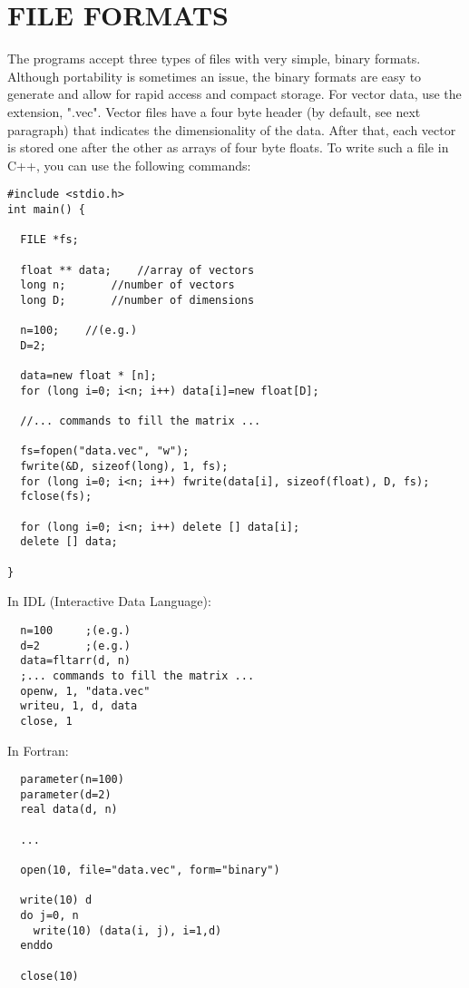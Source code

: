 \documentclass[12pt]{article}
\begin{document}
\section{FILE FORMATS}

  The programs accept three types of files with very simple, binary formats.  Although portability is sometimes an issue, the binary formats are easy to generate and allow for rapid access and compact storage.  For vector data, use the extension, ".vec".  Vector files have a four byte header (by default, see next paragraph) that indicates the dimensionality of the data.  After that, each vector is stored one after the other as arrays of four byte floats.  To write such a file in C++, you can use the following commands:

\begin{verbatim}
#include <stdio.h>
int main() {

  FILE *fs;

  float ** data;	//array of vectors
  long n;		//number of vectors
  long D;		//number of dimensions

  n=100;	//(e.g.)
  D=2;

  data=new float * [n];
  for (long i=0; i<n; i++) data[i]=new float[D];

  //... commands to fill the matrix ...

  fs=fopen("data.vec", "w");
  fwrite(&D, sizeof(long), 1, fs);
  for (long i=0; i<n; i++) fwrite(data[i], sizeof(float), D, fs);
  fclose(fs);
  
  for (long i=0; i<n; i++) delete [] data[i];
  delete [] data;

}
\end{verbatim}

In IDL (Interactive Data Language):

\begin{verbatim}
  n=100		;(e.g.)
  d=2		;(e.g.)
  data=fltarr(d, n)
  ;... commands to fill the matrix ...
  openw, 1, "data.vec"
  writeu, 1, d, data
  close, 1
\end{verbatim}

In Fortran:

\begin{verbatim}
  parameter(n=100)
  parameter(d=2)
  real data(d, n)

  ...

  open(10, file="data.vec", form="binary")
 
  write(10) d
  do j=0, n
    write(10) (data(i, j), i=1,d)
  enddo

  close(10)
\end{verbatim}
\end{document}
